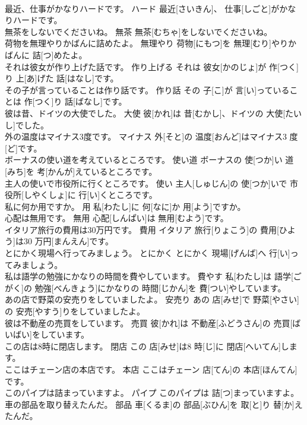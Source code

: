 \documentclass[8pt]{extreport}
\begin{document}
\begin{CJK}{UTF8}{min}
\\	最近、仕事がかなりハードです。	ハード	最近[さいきん]、 仕事[しごと]がかなりハードです。	
\\	無茶をしないでくださいね。	無茶	無茶[むちゃ]をしないでくださいね。	
\\	荷物を無理やりかばんに詰めたよ。	無理やり	荷物[にもつ]を 無理[むり]やりかばんに 詰[つ]めたよ。	
\\	それは彼女が作り上げた話です。	作り上げる	それは 彼女[かのじょ]が 作[つく]り 上[あ]げた 話[はなし]です。	
\\	その子が言っていることは作り話です。	作り話	その 子[こ]が 言[い]っていることは 作[つく]り 話[ばなし]です。	
\\	彼は昔、ドイツの大使でした。	大使	彼[かれ]は 昔[むかし]、ドイツの 大使[たいし]でした。	
\\	外の温度はマイナス3度です。	マイナス	外[そと]の 温度[おんど]はマイナス3 度[ど]です。	
\\	ボーナスの使い道を考えているところです。	使い道	ボーナスの 使[つか]い 道[みち]を 考[かんが]えているところです。	
\\	主人の使いで市役所に行くところです。	使い	主人[しゅじん]の 使[つか]いで 市役所[しやくしょ]に 行[い]くところです。	
\\	私に何か用ですか。	用	私[わたし]に 何[なに]か 用[よう]ですか。	
\\	心配は無用です。	無用	心配[しんぱい]は 無用[むよう]です。	
\\	イタリア旅行の費用は30万円です。	費用	イタリア 旅行[りょこう]の 費用[ひよう]は30 万円[まんえん]です。	
\\	とにかく現場へ行ってみましょう。	とにかく	とにかく 現場[げんば]へ 行[い]ってみましょう。	
\\	私は語学の勉強にかなりの時間を費やしています。	費やす	私[わたし]は 語学[ごがく]の 勉強[べんきょう]にかなりの 時間[じかん]を 費[つい]やしています。	
\\	あの店で野菜の安売りをしていましたよ。	安売り	あの 店[みせ]で 野菜[やさい]の 安売[やすう]りをしていましたよ。	
\\	彼は不動産の売買をしています。	売買	彼[かれ]は 不動産[ふどうさん]の 売買[ばいばい]をしています。	
\\	この店は8時に閉店します。	閉店	この 店[みせ]は8 時[じ]に 閉店[へいてん]します。	
\\	ここはチェーン店の本店です。	本店	ここはチェーン 店[てん]の 本店[ほんてん]です。	
\\	このパイプは詰まっていますよ。	パイプ	このパイプは 詰[つ]まっていますよ。	
\\	車の部品を取り替えたんだ。	部品	車[くるま]の 部品[ぶひん]を 取[と]り 替[か]えたんだ。	

\end{CJK}
\end{document}
